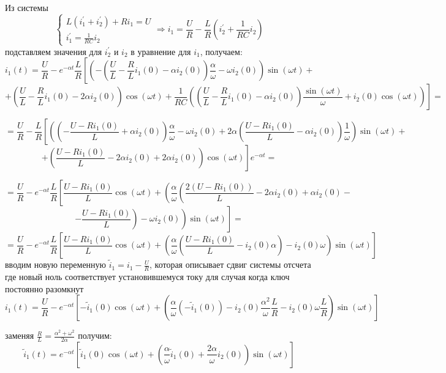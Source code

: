 \documentclass[a4paper,12pt]{article}
\begin{document}
Из системы 
$$
\left\{
\begin{array}{lcl}
	L(i_1^\prime + i_2^\prime) + Ri_1 = U\\[1.5mm]
	i_1^\prime = \frac{1}{RC} i_2
\end{array}\right. \Rightarrow
i_1 = \frac{U}{R} - \frac{L}{R}\left(i_2^\prime + \frac{1}{RC}i_2\right)
$$
подставляем значения для $i_2^\prime$ и $i_2$ в уравнение для $i_1$, получаем:
$$
i_1(t) = \frac{U}{R} - e^{-\alpha t}\frac{L}{R}\left[\left(-\left(\frac{U}{L}-\frac{R}{L}i_1(0) 
- \alpha i_2(0)\right)\frac{\alpha}{\omega}  -\omega i_2(0)\right)\sin(\omega t)\right. +
$$
$$
+\!\left.\left(\!\frac{U}{L}-\frac{R}{L}i_1(0) -2\alpha i_2(0)\!\right)\!\cos(\omega t)
 +
\frac{1}{RC}\!\left(\!\!\left(\frac{U}{L} - \frac{R}{L}i_1(0) -\alpha i_2(0)\!\right)\!\frac{\sin(\omega t)}{\omega}
+i_2(0)\cos(\omega t)\right)
\right]=
$$


$$
= \frac{U}{R} - \frac{L}{R} \!\left[\left(\!\!\left(-\frac{U-Ri_1(0)}{L} + \alpha i_2(0) %
\!\right)\!\frac{\alpha}{\omega} -\omega i_2(0)+ 2\alpha \left(\frac{U - Ri_1(0)}{L} - \alpha i_2(0)\right)\frac{1}{\omega}
\!\right)\sin(\omega t)\right. +
$$
$$
+ \left.\left(\frac{U -Ri_1(0)}{L} - 2\alpha i_2(0) + 2\alpha i_2(0) \right)\cos(\omega t)\right]
e^{-\alpha t} =
$$

$$
=\frac{U}{R} - e^{-\alpha t}\frac{L}{R}\left[\frac{U-Ri_1(0)}{L}\cos(\omega t) +
\left(\frac{\alpha}{\omega} \left( \frac{2(U-Ri_1(0))}{L}  -2 \alpha i_2(0) + \alpha i_2(0) 
\right.\right.\right. -
$$
$$
-\left.\left.\left.\frac{U-Ri_1(0)}{L}\right) 
-\omega i_2(0)\right)\sin(\omega t)\right] =
$$
$$
=\frac{U}{R} - e^{-\alpha t} \frac{L}{R}\left[\frac{U-Ri_1(0)}{L}\cos(\omega t) +
\left(\frac{\alpha}{\omega}
\left(\frac{U-Ri_1(0)}{L} - i_2(0)\alpha\right) - i_2(0)\omega
\right)\sin(\omega t) 
\right]
$$
вводим новую переменную $\tilde{i}_1 = i_1 - \frac{U}{R}$, которая описывает сдвиг системы отсчета где новый ноль соответствует установившемуся току для случая когда ключ постоянно разомкнут
$$
i_1(t)=\frac{U}{R} - e^{-\alpha t} \left[ -\tilde{i}_1(0)\cos(\omega t)  + 
\left( \frac{\alpha}{\omega}\left(-\tilde{i}_1(0)\right) -i_2(0)\frac{\alpha^2}{\omega}\frac{L}{R}
- i_2(0)\omega\frac{L}{R} \right)\sin(\omega t ) %
\right]
$$

заменяя $\frac{R}{L}=\frac{\alpha^2 + \omega^2}{2\alpha}$ получим:
$$
\tilde{i}_1(t) = e^{-\alpha t}\left[ \tilde{i}_1(0)\cos(\omega t) + \left(\frac{\alpha}{\omega}\tilde{i}_1(0) + 
\frac{2\alpha}{\omega} i_2(0)\right) \sin(\omega t)\right]
$$
\end{document}
